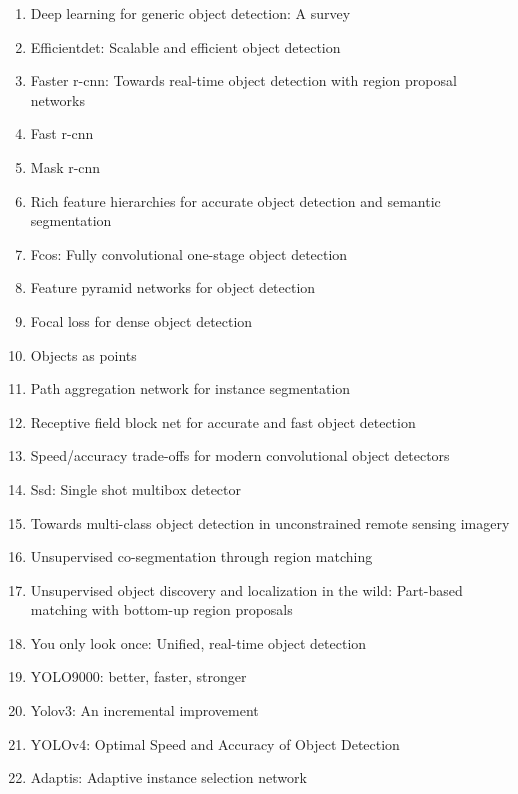 \documentclass[acmlarge]{acmart}
\begin{document}
\begin{enumerate}
	\item Deep learning for generic object detection: A survey \cite{liu2020deep}
	\item Efficientdet: Scalable and efficient object detection \cite{tan2020efficientdet}
	\item Faster r-cnn: Towards real-time object detection with region proposal networks \cite{ren2015faster}
	\item Fast r-cnn \cite{girshick2015fast}
	\item Mask r-cnn \cite{he2017mask}
	\item Rich feature hierarchies for accurate object detection and semantic segmentation \cite{girshick2014rich}
	\item Fcos: Fully convolutional one-stage object detection \cite{tian2019fcos}
	\item Feature pyramid networks for object detection \cite{lin2017feature}
	\item Focal loss for dense object detection \cite{lin2017focal}
	\item Objects as points \cite{zhou2019objects}
	\item Path aggregation network for instance segmentation \cite{liu2018path}
	\item Receptive field block net for accurate and fast object detection \cite{liu2018receptive}
	\item Speed/accuracy trade-offs for modern convolutional object detectors \cite{huang2017speed}
	\item Ssd: Single shot multibox detector \cite{liu2016ssd}
	\item Towards multi-class object detection in unconstrained remote sensing imagery \cite{azimi2018towards}
	\item Unsupervised co-segmentation through region matching \cite{rubio2012unsupervised}
	\item Unsupervised object discovery and localization in the wild: Part-based matching with bottom-up region proposals \cite{cho2015unsupervised}
	\item You only look once: Unified, real-time object detection \cite{redmon2016you}
	\item YOLO9000: better, faster, stronger \cite{redmon2017yolo9000}
	\item Yolov3: An incremental improvement \cite{redmon2018yolov3}
	\item YOLOv4: Optimal Speed and Accuracy of Object Detection \cite{bochkovskiy2020yolov4}
	\item Adaptis: Adaptive instance selection network \cite{sofiiuk2019adaptis}

\end{enumerate}
\end{document}
